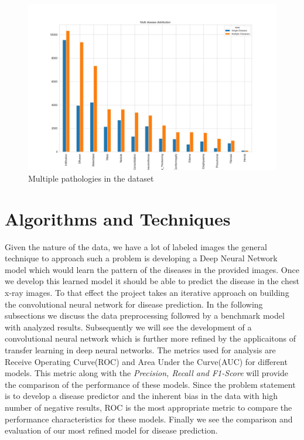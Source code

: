 \documentclass{article}
\begin{document}
    \begin{figure}
        \includegraphics[width=\linewidth]{./images/multiple_disease_distribution.jpg}
        \caption{Multiple pathologies in the dataset}
        \label{fig:multiple-diseases}
    \end{figure}

    \section{Algorithms and Techniques}
    Given the nature of the data, we have a lot of labeled images the general technique to approach such a problem is developing a Deep Neural Network model which would learn the pattern of the diseases in the provided images. Once we develop this learned model it should be able to predict the disease in the chest x-ray images. To that effect the project takes an iterative approach on building the convolutional neural network for disease prediction. In the following subsections we discuss the data preprocessing followed by a benchmark model with analyzed results. Subsequently we will see the development of a convolutional neural network which is further more refined by the applicaitons of transfer learning in deep neural networks. The metrics used for analysis are Receive Operating Curve(ROC) and Area Under the Curve(AUC) for different models. This metric along with the \textit{Precision, Recall and F1-Score} will provide the comparison of the performance of these models. Since the problem statement is to develop a disease predictor and the inherent bias in the data with high number of negative results, ROC is the most appropriate metric to compare the performance characteristics for these models. Finally we see the comparison and evaluation of our most refined model for disease prediction.
    
\end{document}
